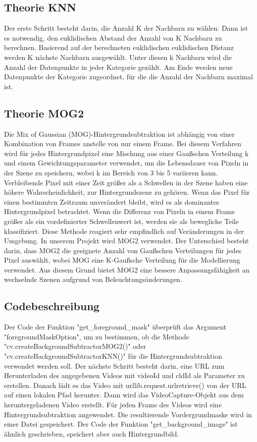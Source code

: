 \documentclass[12pt]{scrartcl}
\begin{document}
\subsection{Theorie KNN}
Der erste Schritt besteht darin, die Anzahl K der Nachbarn zu w\"ahlen. Dann ist es notwendig, den euklidischen Abstand der Anzahl von K Nachbarn zu berechnen. Basierend auf der berechneten euklidischen euklidischen Distanz werden K n\"achste Nachbarn ausgew\"ahlt. Unter diesen k Nachbarn wird die Anzahl der Datenpunkte in jeder Kategorie gez\"ahlt.
Am Ende werden neue Datenpunkte der Kategorie zugeordnet, f\"ur die die Anzahl der Nachbarn maximal ist.
\subsection{Theorie MOG2}
Die Mix of Gaussian (MOG)-Hintergrundsubtraktion ist abh\"angig von einer Kombination von Frames anstelle von nur einem Frame. Bei diesem Verfahren wird f\"ur jedes Hintergrundpixel eine Mischung aus einer Gau{\ss}schen Verteilung k und einem Gewichtungsparameter verwendet, um die Lebensdauer von Pixeln in der Szene zu speichern, wobei k im Bereich von 3 bis 5 variieren kann. Verbleibende Pixel mit einer Zeit gr\"o{\ss}er als a Schwellen in der Szene haben eine h\"ohere Wahrscheinlichkeit, zur Hintergrundszene zu geh\"oren. Wenn das Pixel f\"ur einen bestimmten Zeitraum unver\"andert bleibt, wird es als dominantes Hintergrundpixel betrachtet. Wenn die Differenz von Pixeln in einem Frame gr\"o{\ss}er als ein vordefinierter Schwellenwert ist, werden sie als bewegliche Teile klassifiziert. Diese Methode reagiert sehr empfindlich auf Ver\"anderungen in der Umgebung.
In unserem Projekt wird MOG2 verwendet. Der Unterschied besteht darin, dass MOG2 die geeignete Anzahl von Gau{\ss}schen Verteilungen f\"ur jedes Pixel ausw\"ahlt, wobei MOG eine K-Gau{\ss}sche Verteilung f\"ur die Modellierung verwendet. Aus diesem Grund bietet MOG2 eine bessere Anpassungsf\"ahigkeit an wechselnde Szenen aufgrund von Beleuchtungs\"anderungen.
\subsection{Codebeschreibung}
Der Code der Funktion "get\_foreground\_mask" \"uberpr\"uft das Argument "foregroundMaskOption", um zu bestimmen, ob die Methode "cv.createBackgroundSubtractorMOG2()" oder "cv.createBackgroundSubtractorKNN()" f\"ur die Hintergrundsubtraktion verwendet werden soll. Der n\"achste Schritt besteht darin, eine URL zum Herunterladen des angegebenen Videos mit videoId und cldId als Parameter zu erstellen. Danach l\"adt es das Video mit urllib.request.urlretrieve() von der URL auf einen lokalen Pfad herunter. Dann wird das VideoCapture-Objekt aus dem heruntergeladenen Video erstellt. F\"ur jeden Frame des Videos wird eine Hintergrundsubtraktion angewendet. Die resultierende Vordergrundmaske wird in einer Datei gespeichert.
Der Code der Funktion "get\_background\_image" ist \"ahnlich geschrieben, speichert aber auch Hintergrundbild.\\
\end{document}
